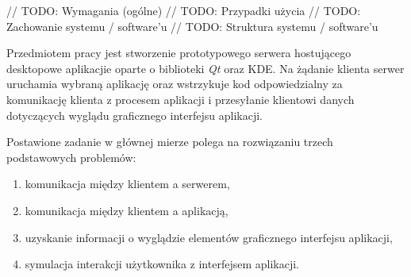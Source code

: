 // TODO: Wymagania (ogólne)
// TODO: Przypadki użycia
// TODO: Zachowanie systemu / software'u
// TODO: Struktura systemu / software'u

Przedmiotem pracy jest stworzenie prototypowego serwera hostującego desktopowe aplikacjie oparte o biblioteki \emph{Qt} oraz KDE. Na żądanie klienta serwer uruchamia wybraną aplikację oraz wstrzykuje kod odpowiedzialny za komunikację klienta z procesem aplikacji i przesyłanie klientowi danych dotyczących wyglądu graficznego interfejsu aplikacji. 

Postawione zadanie w głównej mierze polega na rozwiązaniu trzech podstawowych problemów:
\begin{enumerate}
  \item komunikacja między klientem a serwerem,
  \item komunikacja między klientem a aplikacją,
  \item uzyskanie informacji o wyglądzie elementów graficznego interfejsu aplikacji,
  \item symulacja interakcji użytkownika z interfejsem aplikacji.
\end{enumerate}